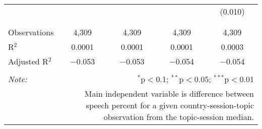 \begin{table}[!htbp]
\begin{tabular}{@{\extracolsep{5pt}}lcccc}
  &  &  &  & (0.010) \\ 
  & & & & \\ 
\hline \\[-1.8ex] 
Observations & 4,309 & 4,309 & 4,309 & 4,309 \\ 
R$^{2}$ & 0.0001 & 0.0001 & 0.0001 & 0.0003 \\ 
Adjusted R$^{2}$ & $-$0.053 & $-$0.053 & $-$0.054 & $-$0.054 \\ 
\hline 
\hline \\[-1.8ex] 
\textit{Note:}  & \multicolumn{4}{r}{$^{*}$p$<$0.1; $^{**}$p$<$0.05; $^{***}$p$<$0.01} \\ 
 & \multicolumn{4}{r}{Main independent variable is difference between speech percent for a given country-session-topic observation from the topic-session median.} \\ 
\end{tabular} 
\end{table} 
